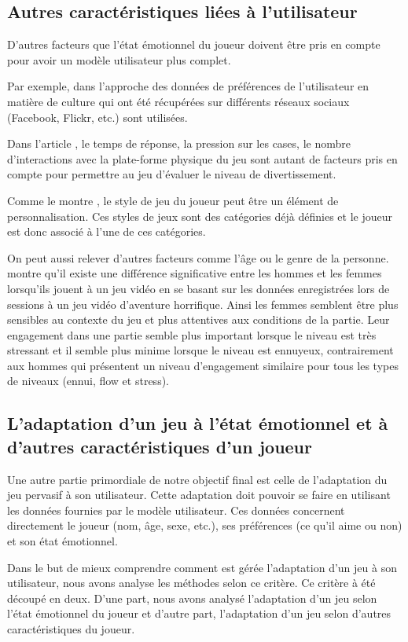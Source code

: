 \documentclass{article}
\begin{document}
    \subsection{Autres caractéristiques liées à l'utilisateur}
    \label{sec:caractéristiques}
        D’autres facteurs que l’état émotionnel du joueur doivent être pris en compte pour avoir un modèle utilisateur plus complet.\par
        Par exemple, dans l'approche \cite{noor_et_al._2009} des données de préférences de l’utilisateur en matière de culture qui ont été récupérées sur différents réseaux sociaux (Facebook, Flickr, etc.) sont utilisées.\par
        Dans l’article \cite{yannakakis_et_al._2009}, le temps de réponse, la pression sur les cases, le nombre d’interactions avec la plate-forme physique du jeu sont autant de facteurs pris en compte pour permettre au jeu d'évaluer le niveau de divertissement.\par
        Comme le montre \cite{Mostefai_et_al._2019}, le style de jeu du joueur peut être un élément de personnalisation. 
        Ces styles de jeux sont des catégories déjà définies et le joueur est donc associé à l'une de ces catégories.\par
        On peut aussi relever d’autres facteurs comme l’âge ou le genre de la personne. \cite{carofiglio_et_al._2019} montre qu'il existe une différence significative entre les hommes et les femmes lorsqu’ils jouent à un jeu vidéo en se basant sur les données enregistrées lors de sessions à un jeu vidéo d’aventure horrifique. 
        Ainsi les femmes semblent être plus sensibles au contexte du jeu et plus attentives aux conditions de la partie. 
        Leur engagement dans une partie semble plus important lorsque le niveau est très stressant et il semble plus minime lorsque le niveau est ennuyeux, contrairement aux hommes qui présentent un niveau d’engagement similaire  pour tous les types de niveaux (ennui, flow et stress).
    \subsection{L'adaptation d'un jeu à l'état émotionnel et à d'autres caractéristiques d'un joueur}
    \label{sect:adaptation}
        Une autre partie primordiale de notre objectif final est celle de l'adaptation du jeu pervasif à son utilisateur. Cette adaptation doit pouvoir se faire en utilisant les données fournies par le modèle utilisateur. Ces données concernent directement le joueur (nom, âge, sexe, etc.), ses préférences (ce qu'il aime ou non) et son état émotionnel.\par
        Dans le but de mieux comprendre comment est gérée l'adaptation d'un jeu à son utilisateur, nous avons analyse les méthodes selon ce critère. Ce critère à été découpé en deux. D'une part, nous avons analysé l'adaptation d'un jeu selon l'état émotionnel du joueur et d'autre part, l'adaptation d'un jeu selon d'autres caractéristiques du joueur.
\end{document}
